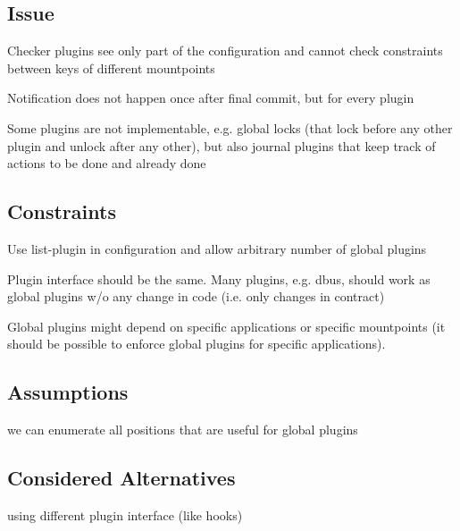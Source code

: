 \subsection*{Issue}


\begin{DoxyItemize}
\item Checker plugins see only part of the configuration and cannot check constraints between keys of different mountpoints
\item Notification does not happen once after final commit, but for every plugin
\item Some plugins are not implementable, e.\+g. global locks (that lock before any other plugin and unlock after any other), but also journal plugins that keep track of actions to be done and already done
\end{DoxyItemize}

\subsection*{Constraints}


\begin{DoxyItemize}
\item Use list-\/plugin in configuration and allow arbitrary number of global plugins
\item Plugin interface should be the same. Many plugins, e.\+g. dbus, should work as global plugins w/o any change in code (i.\+e. only changes in contract)
\item Global plugins might depend on specific applications or specific mountpoints (it should be possible to enforce global plugins for specific applications).
\end{DoxyItemize}

\subsection*{Assumptions}


\begin{DoxyItemize}
\item we can enumerate all positions that are useful for global plugins
\end{DoxyItemize}

\subsection*{Considered Alternatives}


\begin{DoxyItemize}
\item using different plugin interface (like hooks)
\end{DoxyItemize}

